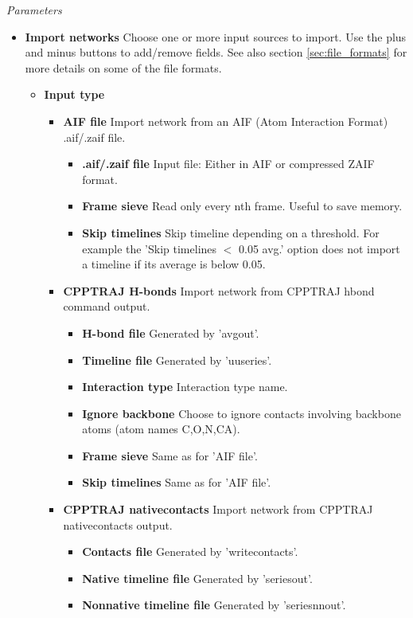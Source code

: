 \textit{Parameters}
\begin{itemize}
\item \textbf{Import networks} Choose one or more input sources to import. Use the plus and minus buttons to add/remove fields. See also section \ref{sec:file_formats} for more details on some of the file formats.
  \begin{itemize}
    \item \textbf{Input type}
  \begin{itemize}
  \item \textbf{AIF file} Import network from an AIF (Atom Interaction Format) .aif/.zaif file.
    \begin{itemize}
    \item \textbf{.aif/.zaif file} Input file: Either in AIF or compressed ZAIF format.
    \item \textbf{Frame sieve} Read only every nth frame. Useful to save memory.
    \item \textbf{Skip timelines} Skip timeline depending on a threshold. For example the 'Skip timelines $<$ 0.05 avg.' option does not import a timeline if its average is below 0.05.
    \end{itemize}
  \item \textbf{CPPTRAJ H-bonds} Import network from CPPTRAJ \cite{CPPTRAJ} hbond command output.
    \begin{itemize}
    \item \textbf{H-bond file} Generated by 'avgout'.
    \item \textbf{Timeline file} Generated by 'uuseries'.
    \item \textbf{Interaction type} Interaction type name.
    \item \textbf{Ignore backbone} Choose to ignore contacts involving backbone atoms (atom names C,O,N,CA).
    \item \textbf{Frame sieve} Same as for 'AIF file'.
    \item \textbf{Skip timelines} Same as for 'AIF file'.
    \end{itemize}
  \item \textbf{CPPTRAJ nativecontacts} Import network from CPPTRAJ nativecontacts output.
    \begin{itemize}
    \item \textbf{Contacts file} Generated by 'writecontacts'.
    \item \textbf{Native timeline file} Generated by 'seriesout'.
    \item \textbf{Nonnative timeline file} Generated by 'seriesnnout'.

\end{itemize}
\end{itemize}
\end{itemize}
\end{itemize}
